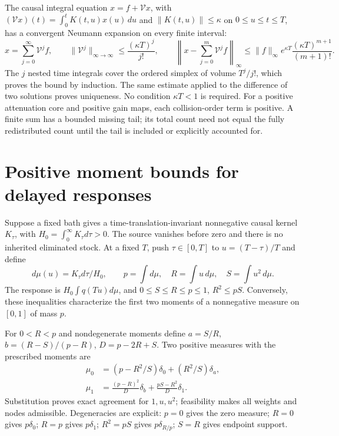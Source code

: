 The causal integral equation $x=f+\mathcal Vx$, with
$(\mathcal Vx)(t)=\int_0^tK(t,u)x(u)\,du$ and $\|K(t,u)\|\le\kappa$ on $0\le u\le t\le T$, has a convergent Neumann expansion on every finite interval:
\begin{equation}
 x=\sum_{j=0}^{\infty}\mathcal V^jf,\qquad
 \|\mathcal V^j\|_{\infty\to\infty}\le\frac{(\kappa T)^j}{j!},\qquad
 \left\|x-\sum_{j=0}^{m}\mathcal V^jf\right\|_\infty
 \le \|f\|_\infty e^{\kappa T}
 \frac{(\kappa T)^{m+1}}{(m+1)!}.
 \label{v:volterra_neumann}
\end{equation}
The $j$ nested time integrals cover the ordered simplex of volume $T^j/j!$, which proves the bound by induction. The same estimate applied to the difference of two solutions proves uniqueness. No condition $\kappa T<1$ is required. For a positive attenuation core and positive gain maps, each collision-order term is positive. A finite sum has a bounded missing tail; its total count need not equal the fully redistributed count until the tail is included or explicitly accounted for.

\section{Positive moment bounds for delayed responses}
\label{v:moment_memory}

Suppose a fixed bath gives a time-translation-invariant nonnegative causal kernel $K_\tau$, with $H_0=\int_0^\infty K_\tau d\tau>0$. The source vanishes before zero and there is no inherited eliminated stock. At a fixed $T$, push $\tau\in[0,T]$ to $u=(T-\tau)/T$ and define
\begin{equation}
 d\mu(u)=K_\tau d\tau/H_0,\qquad
 p=\int d\mu,\quad R=\int u\,d\mu,\quad S=\int u^2\,d\mu.
 \label{v:delay_moments}
\end{equation}
The response is $H_0\int q(Tu)d\mu$, and
$0\le S\le R\le p\le1$, $R^2\le pS$. Conversely, these inequalities characterize the first two moments of a nonnegative measure on $[0,1]$ of mass $p$.

For $0<R<p$ and nondegenerate moments define
$a=S/R$, $b=(R-S)/(p-R)$, $D=p-2R+S$. Two positive measures with the prescribed moments are
\begin{align}
 \mu_0&=(p-R^2/S)\delta_0+(R^2/S)\delta_a,\nonumber\\
 \mu_1&=\frac{(p-R)^2}{D}\delta_b+
 \frac{pS-R^2}{D}\delta_1 .
 \label{v:radau}
\end{align}
Substitution proves exact agreement for $1,u,u^2$; feasibility makes all weights and nodes admissible. Degeneracies are explicit: $p=0$ gives the zero measure; $R=0$ gives $p\delta_0$; $R=p$ gives $p\delta_1$; $R^2=pS$ gives $p\delta_{R/p}$; $S=R$ gives endpoint support.

